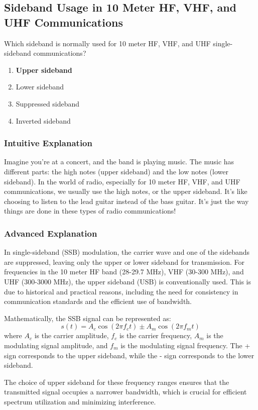 \subsection{Sideband Usage in 10 Meter HF, VHF, and UHF Communications}
\label{T8A06}

\begin{tcolorbox}[colback=gray!10!white,colframe=black!75!black,title=T8A06]
Which sideband is normally used for 10 meter HF, VHF, and UHF single-sideband communications?
\begin{enumerate}[label=\Alph*]
    \item \textbf{Upper sideband}
    \item Lower sideband
    \item Suppressed sideband
    \item Inverted sideband
\end{enumerate}
\end{tcolorbox}

\subsubsection{Intuitive Explanation}
Imagine you're at a concert, and the band is playing music. The music has different parts: the high notes (upper sideband) and the low notes (lower sideband). In the world of radio, especially for 10 meter HF, VHF, and UHF communications, we usually use the high notes, or the upper sideband. It's like choosing to listen to the lead guitar instead of the bass guitar. It’s just the way things are done in these types of radio communications!

\subsubsection{Advanced Explanation}
In single-sideband (SSB) modulation, the carrier wave and one of the sidebands are suppressed, leaving only the upper or lower sideband for transmission. For frequencies in the 10 meter HF band (28-29.7 MHz), VHF (30-300 MHz), and UHF (300-3000 MHz), the upper sideband (USB) is conventionally used. This is due to historical and practical reasons, including the need for consistency in communication standards and the efficient use of bandwidth.

Mathematically, the SSB signal can be represented as:
\[ s(t) = A_c \cos(2\pi f_c t) \pm A_m \cos(2\pi f_m t) \]
where \( A_c \) is the carrier amplitude, \( f_c \) is the carrier frequency, \( A_m \) is the modulating signal amplitude, and \( f_m \) is the modulating signal frequency. The + sign corresponds to the upper sideband, while the - sign corresponds to the lower sideband.

The choice of upper sideband for these frequency ranges ensures that the transmitted signal occupies a narrower bandwidth, which is crucial for efficient spectrum utilization and minimizing interference.

